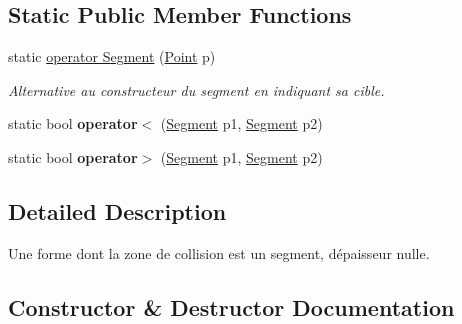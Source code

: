 \subsection*{Static Public Member Functions}
\begin{DoxyCompactItemize}
\item 
static \hyperlink{class_tentacle_slicers_1_1collisions_1_1_segment_afc2e42528b122bc5307209e10ef13689}{operator Segment} (\hyperlink{class_tentacle_slicers_1_1general_1_1_point}{Point} p)
\begin{DoxyCompactList}\small\item\em Alternative au constructeur du segment en indiquant sa cible. \end{DoxyCompactList}\item 
\mbox{\label{class_tentacle_slicers_1_1collisions_1_1_segment_a36fdbb7df8aee1de72139c9862625201}} 
static bool {\bfseries operator$<$} (\hyperlink{class_tentacle_slicers_1_1collisions_1_1_segment}{Segment} p1, \hyperlink{class_tentacle_slicers_1_1collisions_1_1_segment}{Segment} p2)
\item 
\mbox{\label{class_tentacle_slicers_1_1collisions_1_1_segment_a2f3e63b7a26e9ba24ac063b8d232f701}} 
static bool {\bfseries operator$>$} (\hyperlink{class_tentacle_slicers_1_1collisions_1_1_segment}{Segment} p1, \hyperlink{class_tentacle_slicers_1_1collisions_1_1_segment}{Segment} p2)
\end{DoxyCompactItemize}


\subsection{Detailed Description}
Une forme dont la zone de collision est un segment, d\textquotesingle{}épaisseur nulle. 



\subsection{Constructor \& Destructor Documentation}
\mbox{\label{class_tentacle_slicers_1_1collisions_1_1_segment_ade4ddd9352ef4b56cee6ac58d639eae2}} 
